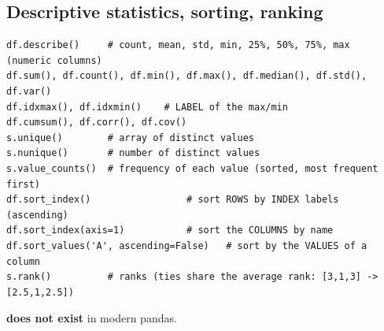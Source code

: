 \subsection{Descriptive statistics, sorting, ranking}
\begin{codebox}
\begin{Verbatim}
df.describe()     # count, mean, std, min, 25%, 50%, 75%, max  (numeric columns)
df.sum(), df.count(), df.min(), df.max(), df.median(), df.std(), df.var()
df.idxmax(), df.idxmin()    # LABEL of the max/min
df.cumsum(), df.corr(), df.cov()
s.unique()        # array of distinct values
s.nunique()       # number of distinct values
s.value_counts()  # frequency of each value (sorted, most frequent first)
df.sort_index()                 # sort ROWS by INDEX labels (ascending)
df.sort_index(axis=1)           # sort the COLUMNS by name
df.sort_values('A', ascending=False)   # sort by the VALUES of a column
s.rank()          # ranks (ties share the average rank: [3,1,3] -> [2.5,1,2.5])
\end{Verbatim}
\end{codebox}
 \textbf{does not exist} in modern pandas.

